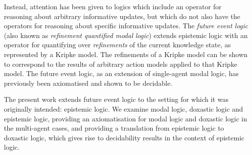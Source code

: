 Instead, attention has been given to logics which include an operator for
reasoning about arbitrary informative updates, but which do not also have the
operators for reasoning about specific informative updates. The {\em future
event logic} (also known as {\em refinement quantified modal logic}) extends
epistemic logic with an operator for quantifying over {\em refinements} of the
current knowledge state, as represented by a Kripke model. The refinements of a
Kripke model can be shown to correspond to the results of arbitrary action
models applied to that Kripke model. The future event logic, as an extension of
single-agent modal logic, has previously been axiomatised and shown to be
decidable.

The present work extends future event logic to the setting for which it was
originally intended: epistemic logic. We examine modal logic, doxastic logic and
epistemic logic, providing an axiomatisation for modal logic and doxastic logic
in the multi-agent cases, and providing a translation from epistemic logic to
doxastic logic, which gives rise to decidability results in the context of
epistemic logic.
